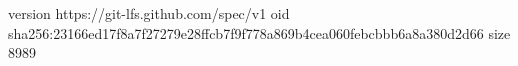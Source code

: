 version https://git-lfs.github.com/spec/v1
oid sha256:23166ed17f8a7f27279e28ffcb7f9f778a869b4cea060febcbbb6a8a380d2d66
size 8989
